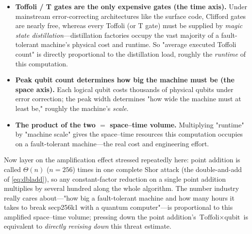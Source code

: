 \documentclass[11pt]{article}
\begin{document}
\begin{itemize}[leftmargin=1.4em]
\item \textbf{Toffoli / T gates are the only expensive gates (the time axis).} Under mainstream error-correcting architectures like the surface code, Clifford gates are nearly free, whereas every
Toffoli (or T gate) must be supplied by \emph{magic state distillation}---distillation factories occupy the vast majority of a fault-tolerant machine's physical
cost and runtime. So "average executed Toffoli count" is directly proportional to the distillation load, roughly the \emph{runtime} of this computation.
\item \textbf{Peak qubit count determines how big the machine must be (the space axis).} Each logical qubit costs thousands of physical qubits under error correction; the peak
width determines "how wide the machine must at least be," roughly the machine's \emph{scale}.
\item \textbf{The product of the two $=$ space--time volume.} Multiplying "runtime" by "machine scale" gives the space--time resources this computation occupies on a fault-tolerant machine---the
real cost and engineering effort.
\end{itemize}

Now layer on the amplification effect stressed repeatedly here: point addition is called $\Theta(n)$ ($n=256$) times in one complete Shor attack (the
double-and-add of \eqref{eq:dbladd}), so any constant-factor reduction on a single point addition multiplies by several hundred along the whole algorithm. The number industry really cares about---"how big a fault-tolerant machine
and how many hours it takes to break secp256k1 with a quantum computer"---is proportional to this amplified space--time volume; pressing down the point addition's
$\text{Toffoli}\times\text{qubit}$ is equivalent to \emph{directly revising down} this threat estimate.
\end{document}
